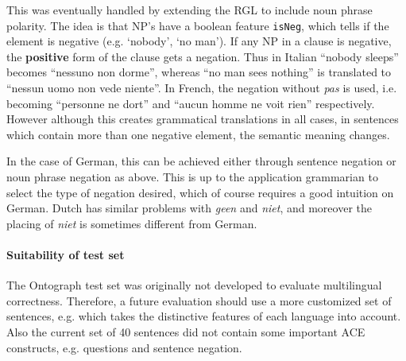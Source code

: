 \documentclass[a4paper]{article}
\begin{document}
This was eventually handled by extending the RGL to include noun
phrase polarity.  The idea is that NP's have a boolean feature
\verb|isNeg|, which tells if the element is negative (e.g. `nobody', `no
man'). If any NP in a clause is negative, the \textbf{positive} form of
the clause gets a negation. Thus in Italian ``nobody sleeps'' becomes
``nessuno non dorme'', whereas ``no man sees nothing'' is translated
to ``nessun uomo non vede niente''.  In French, the negation without
\emph{pas} is used, i.e. becoming ``personne ne dort'' and ``aucun
homme ne voit rien'' respectively.
However although this creates grammatical translations in all cases,
in sentences which contain more than one negative element, the
semantic meaning changes.

In the case of German, this can be achieved either through sentence
negation or noun phrase negation as above.
This is up to the application grammarian to select the type of
negation desired, which of course requires a good intuition on German.
Dutch has similar problems with \emph{geen} and \emph{niet}, and
moreover the placing of \emph{niet} is sometimes different from
German.

\paragraph{Suitability of test set}

The Ontograph test set was originally not developed to evaluate multilingual
correctness. Therefore, a future evaluation should use a more customized
set of sentences, e.g. which takes the distinctive features of each language
into account.
Also the current set of 40 sentences did not contain some important ACE
constructs, e.g. questions and sentence negation.

\end{document}
